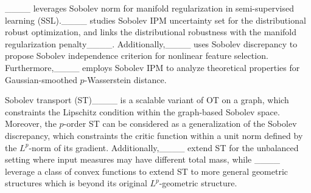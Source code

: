 ____ leverages Sobolev norm for manifold regularization in semi-supervised learning (SSL).____ studies Sobolev IPM uncertainty set for the distributional robust optimization, and links the distributional robustness with the manifold regularization penalty____. Additionally,____ uses Sobolev discrepancy to propose Sobolev independence criterion for nonlinear feature selection. Furthermore,____ employs Sobolev IPM to analyze theoretical properties for Gaussian-smoothed $p$-Wasserstein distance.


Sobolev transport (ST)____ is a scalable variant of OT on a graph, which constraints the Lipschitz condition within the graph-based Sobolev space. Moreover, the $p$-order ST can be considered as a generalization of the Sobolev discrepancy, which constraints the critic function within a unit norm defined by the $L^p$-norm of its gradient. Additionally,____ extend ST for the unbalanced setting where input measures may have different total mass, while ____ leverage a class of convex functions to extend ST to more general geometric structures which is beyond its original $L^p$-geometric structure.

